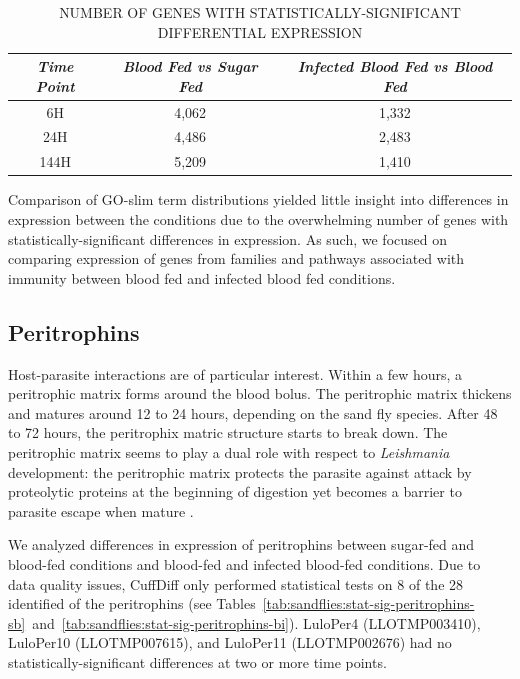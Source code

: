 \begin{table}[H]
  \begin{center}
    \small
  \caption{\label{tab:stat-sig-genes} \uppercase{Number of Genes with Statistically-Significant Differential Expression}}
  \begin{tabular}{c c c} \hline
  \emph{Time Point} & \emph{Blood Fed vs Sugar Fed} & \emph{Infected Blood Fed vs Blood Fed} \\ \hline
  6H & 4,062 & 1,332 \\
  24H & 4,486 & 2,483 \\
  144H & 5,209 & 1,410 \\
  \end{tabular}
  \end{center}
\end{table}

Comparison of GO-slim term distributions yielded little insight into differences in expression between the conditions due to the overwhelming number of genes with statistically-significant differences in expression.  As such, we focused on comparing expression of genes from families and pathways associated with immunity between blood fed and infected blood fed conditions.

\subsection{Peritrophins}
Host-parasite interactions are of particular interest.  Within a few hours, a peritrophic matrix forms around the blood bolus.  The peritrophic matrix thickens and matures around 12 to 24 hours, depending on the sand fly species.  After 48 to 72 hours, the peritrophix matric structure starts to break down.  The peritrophic matrix seems to play a dual role with respect to \emph{Leishmania} development: the peritrophic matrix protects the parasite against attack by proteolytic proteins at the beginning of digestion yet becomes a barrier to parasite escape when mature \cite{Pimenta1997,Dostalova2012}.

We analyzed differences in expression of peritrophins between sugar-fed and blood-fed conditions and blood-fed and infected blood-fed conditions.  Due to data quality issues, CuffDiff only performed statistical tests on 8 of the 28 identified of the peritrophins (see Tables~\ref{tab:sandflies:stat-sig-peritrophins-sb}~and~\ref{tab:sandflies:stat-sig-peritrophins-bi}).  LuloPer4 (LLOTMP003410), LuloPer10 (LLOTMP007615), and LuloPer11 (LLOTMP002676) had no statistically-significant differences at two or more time points.


